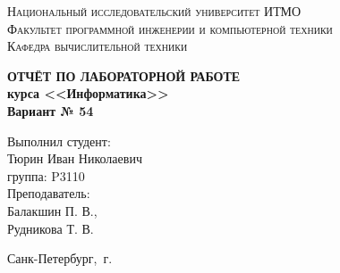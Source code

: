 \documentclass[14pt,final,oneside]{extreport}
\begin{document}
\newcommand\labnumber{3}
\newcommand\student{Тюрин Иван Николаевич} %
\newcommand\studygroup{P3110} %
\newcommand\variant{№ 54}
\newcommand\subject{Информатика}
\newcommand\teacher{Балакшин П. В.,\\
                    Рудникова Т. В.}

\newcommand\labname{Синтез помехоустойчивого кода}

\renewcommand{\chaptername}{Лабораторная работа} %
\def\contentsname{Содержание} %


\begin{titlepage}

    \begin{center}
    \textsc{Национальный исследовательский университет ИТМО\\[5mm]
    Факультет программной инженерии и компьютерной техники\\[2mm]
    Кафедра вычислительной техники}

    \vfill
    \vfill
    \textbf{ОТЧЁТ ПО ЛАБОРАТОРНОЙ РАБОТЕ\\[3mm]
    курса <<\subject>> \\[6mm]
    Вариант \variant
    \\[20mm]
    }
    \end{center}


\hfill
\hfill

    \begin{flushright}
        \begin{minipage}{.5\textwidth}
            
        Выполнил студент:\\[2mm] 
        \student\\[2mm]
        группа: \studygroup\\[5mm]

        Преподаватель:\\[2mm] 
        \teacher

        \end{minipage}%
    \end{flushright}

\vfill

    \begin{center}
        Санк-Петербург, \the\year\,г.
    \end{center}

\end{titlepage}
\end{document}

